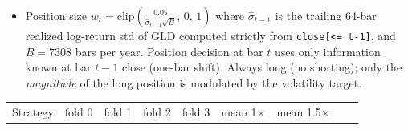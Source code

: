 \documentclass[
]{article}
\newcounter{none} %
\providecommand{\tightlist}{%
  \setlength{\itemsep}{0pt}\setlength{\parskip}{0pt}}
\begin{document}
\begin{itemize}
\tightlist
\item
  Position size
  \(w_t = \mathrm{clip}\!\left(\frac{0.05}{\hat{\sigma}_{t-1} \sqrt{B}},\, 0,\, 1\right)\)
  where \(\hat{\sigma}_{t-1}\) is the trailing 64-bar realized
  log-return std of GLD computed strictly from
  \texttt{close{[}\textless{}=\ t-1{]}}, and \(B = 7308\) bars per year.
  Position decision at bar \(t\) uses only information known at bar
  \(t-1\) close (one-bar shift). Always long (no shorting); only the
  \emph{magnitude} of the long position is modulated by the volatility
  target.
\end{itemize}

{\def\LTcaptype{none} %
\begin{longtable}[]{@{}
  >{\raggedright\arraybackslash}p{}
  >{\raggedleft\arraybackslash}p{}
  >{\raggedleft\arraybackslash}p{}
  >{\raggedleft\arraybackslash}p{}
  >{\raggedleft\arraybackslash}p{}
  >{\raggedleft\arraybackslash}p{}
  >{\raggedleft\arraybackslash}p{}
  >{\raggedleft\arraybackslash}p{}
  >{\centering\arraybackslash}p{}@{}}
\toprule\noalign{}
\begin{minipage}[b]{\linewidth}\raggedright
Strategy
\end{minipage} & \begin{minipage}[b]{\linewidth}\raggedleft
fold 0
\end{minipage} & \begin{minipage}[b]{\linewidth}\raggedleft
fold 1
\end{minipage} & \begin{minipage}[b]{\linewidth}\raggedleft
fold 2
\end{minipage} & \begin{minipage}[b]{\linewidth}\raggedleft
fold 3
\end{minipage} & \begin{minipage}[b]{\linewidth}\raggedleft
mean 1×
\end{minipage} & \begin{minipage}[b]{\linewidth}\raggedleft
mean 1.5×
\end{minipage} & \begin{minipage}[b]{\linewidth}\raggedleft

\end{minipage}
\end{longtable}}
\end{document}
